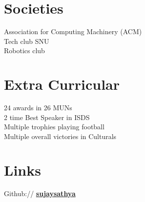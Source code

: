 \documentclass[]{deedy-resume-reversed}
\begin{document}
\begin{minipage}[t]{0.33\textwidth}
\section{Societies}
Association for Computing Machinery (ACM)\\
Tech club SNU\\
Robotics club
\sectionsep


\section{Extra Curricular}
24 awards in 26 MUNs \\
2 time Best Speaker in ISDS \\
Multiple trophies playing football \\
Multiple overall victories in Culturals \\
\sectionsep


\section{Links}
Github:// \href{https://github.com/sujaysathya}{\bf sujaysathya} \\

\sectionsep


\end{minipage}
\end{document}
